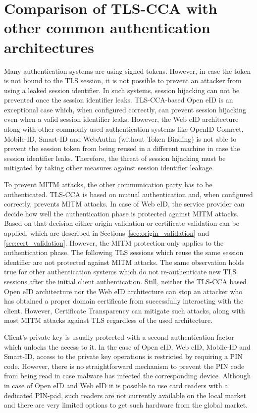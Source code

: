 \section{Comparison of TLS-CCA with other common authentication architectures}
Many authentication systems are using signed tokens. However, in case the token is not bound to the TLS session, it is not possible to prevent an attacker from using a leaked session identifier. In such systems, session hijacking can not be prevented once the session identifier leaks. TLS-CCA-based Open eID is an exceptional case which, when configured correctly, can prevent session hijacking even when a valid session identifier leaks. However, the Web eID architecture along with other commonly used authentication systems like OpenID Connect, Mobile-ID, Smart-ID and WebAuthn (without Token Binding) is not able to prevent the session token from being reused in a different machine in case the session identifier leaks. Therefore, the threat of session hijacking must be mitigated by taking other measures against session identifier leakage.

To prevent MITM attacks, the other communication party has to be authenticated. TLS-CCA is based on mutual authentication and, when configured correctly, prevents MITM attacks. In case of Web eID, the service provider can decide how well the authentication phase is protected against MITM attacks. Based on that decision either origin validation or certificate validation can be applied, which are described in Sections~\ref{sec:origin_validation} and \ref{sec:cert_validation}. However, the MITM protection only applies to the authentication phase. The following TLS sessions which reuse the same session identifier are not protected against MITM attacks. The same observation holds true for other authentication systems which do not re-authenticate new TLS sessions after the initial client authentication. Still, neither the TLS-CCA based Open eID architecture nor the Web eID architecture can stop an attacker who has obtained a proper domain certificate from successfully interacting with the client. However, Certificate Transparency can mitigate such attacks, along with most MITM attacks against TLS regardless of the used architecture.

Client's private key is usually protected with a second authentication factor which unlocks the access to it. In the case of Open eID, Web eID, Mobile-ID and Smart-ID, access to the private key operations is restricted by requiring a PIN code. However, there is no straightforward mechanism to prevent the PIN code from being read in case malware has infected the corresponding device. Although in case of Open eID and Web eID it is possible to use card readers with a dedicated PIN-pad, such readers are not currently available on the local market and there are very limited options to get such hardware from the global market.

